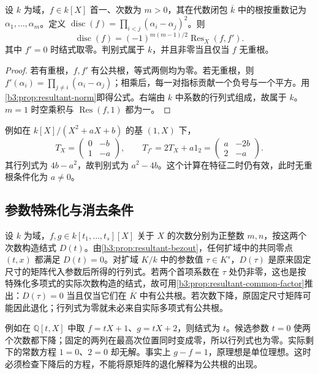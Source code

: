 \begin{corollary}\label{b3:cor:resultant-discriminant}
	设 \(k\) 为域，\(f\in k[X]\) 首一、次数为 \(m>0\)，其在代数闭包 \(\overline k\) 中的根按重数记为 \(\alpha_1,\ldots,\alpha_m\)。定义 \(\operatorname{disc}(f)=\prod_{i<j}(\alpha_i-\alpha_j)^2\)。则
	\[
		\operatorname{disc}(f)=(-1)^{m(m-1)/2}\operatorname{Res}_X(f,f').
	\]
	其中 \(f'=0\) 时结式取零。判别式属于 \(k\)，并且非零当且仅当 \(f\) 无重根。
\end{corollary}
\begin{proof}
	若有重根，\(f,f'\) 有公共根，等式两侧均为零。若无重根，则 \(f'(\alpha_i)=\prod_{j\ne i}(\alpha_i-\alpha_j)\)；相乘后，每一对指标贡献一个负号与一个平方。用\cref{b3:prop:resultant-norm}即得公式。右端由 \(k\) 中系数的行列式组成，故属于 \(k\)。\(m=1\) 时空乘积与 \(\operatorname{Res}(f,1)\) 都为一。
\end{proof}

例如在 \(k[X]/(X^2+aX+b)\) 的基 \((1,X)\) 下，
\[
	T_X=\begin{pmatrix}0&-b\\1&-a\end{pmatrix},\qquad
	T_{f'}=2T_X+a1_2=\begin{pmatrix}a&-2b\\2&-a\end{pmatrix}.
\]
其行列式为 \(4b-a^2\)，故判别式为 \(a^2-4b\)。这个计算在特征二时仍有效，此时无重根条件化为 \(a\ne0\)。

\subsection{参数特殊化与消去条件}
\label{b3:subsec:0806:03}

设 \(k\) 为域，\(f,g\in k[t_1,\ldots,t_s][X]\) 关于 \(X\) 的次数分别为正整数 \(m,n\)，按这两个次数构造结式 \(D(t)\)。由\cref{b3:prop:resultant-bezout}，任何扩域中的共同零点 \((t,x)\) 都满足 \(D(t)=0\)。对扩域 \(K/k\) 中的参数值 \(\tau\in K^s\)，\(D(\tau)\) 是原来固定尺寸的矩阵代入参数后所得的行列式。若两个首项系数在 \(\tau\) 处仍非零，这也是按特殊化多项式的实际次数构造的结式，故可用\cref{b3:prop:resultant-common-factor}推出：\(D(\tau)=0\) 当且仅当它们在 \(\overline K\) 中有公共根。若次数下降，原固定尺寸矩阵可能因此退化；行列式为零就未必来自实际多项式有公共根。

\ProseParagraphBreak
例如在 \(\mathbb Q[t,X]\) 中取 \(f=tX+1\)、\(g=tX+2\)，则结式为 \(t\)。候选参数 \(t=0\) 使两个次数都下降；固定的两列在最高次位置同时变成零，所以行列式也为零。实际剩下的常数方程 \(1=0\)、\(2=0\) 却无解。事实上 \(g-f=1\)，原理想是单位理想。这时必须检查下降后的方程，不能将原矩阵的退化解释为公共根的出现。

